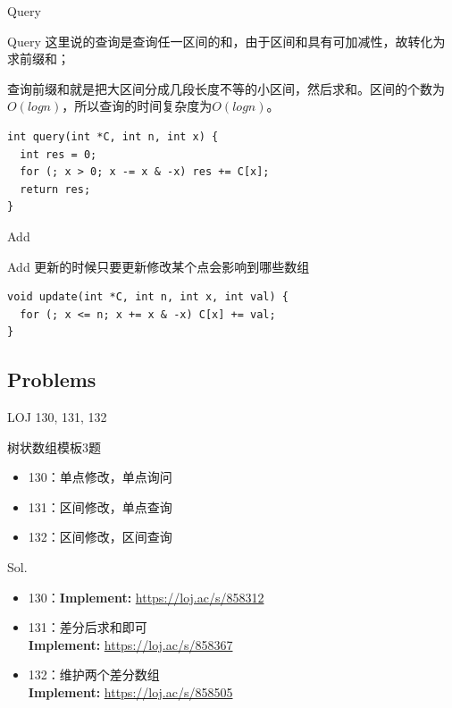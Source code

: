 \documentclass{beamer}
\begin{document}
\begin{frame}[fragile]{Query}
  \begin{block}{Query}
  这里说的查询是查询任一区间的和，由于区间和具有可加减性，故转化为求前缀和；

查询前缀和就是把大区间分成几段长度不等的小区间，然后求和。区间的个数为$O(logn)$，所以查询的时间复杂度为$O(logn)$。
    \begin{lstlisting}
int query(int *C, int n, int x) {
  int res = 0;
  for (; x > 0; x -= x & -x) res += C[x];
  return res;
}
    \end{lstlisting}
  \end{block}
\end{frame}

\begin{frame}[fragile]{Add}
  \begin{block}{Add}
  更新的时候只要更新修改某个点会影响到哪些数组
    \begin{lstlisting}
void update(int *C, int n, int x, int val) {
  for (; x <= n; x += x & -x) C[x] += val;
}
    \end{lstlisting}
  \end{block}
\end{frame}

\subsection{Problems}
\begin{frame}[shrink]{LOJ 130, 131, 132}
  \begin{block}{树状数组模板3题}
      \begin{itemize}
          \item 130：单点修改，单点询问
          \item 131：区间修改，单点查询
          \item 132：区间修改，区间查询
      \end{itemize}
  \end{block}

  \pause
  \begin{block}{Sol.}
  \begin{itemize}
      \item 130：\textbf{Implement:} \url{https://loj.ac/s/858312}
      \item 131：差分后求和即可 \\
        \textbf{Implement:} \url{https://loj.ac/s/858367}
      \item 132：维护两个差分数组 \\
         \textbf{Implement:} \url{https://loj.ac/s/858505}
  \end{itemize}
  \end{block}

\end{frame}
\end{document}
